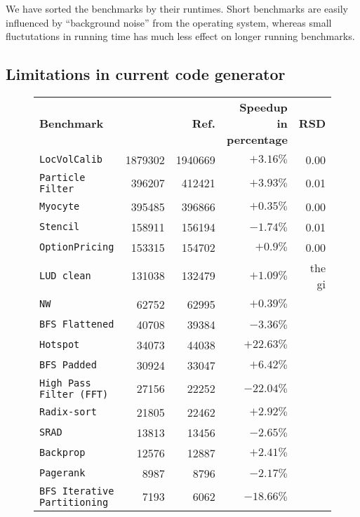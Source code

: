 We have sorted the benchmarks by their runtimes.
Short benchmarks are easily influenced by ``background noise'' from the
operating system, whereas small fluctutations in running time has much less
effect on longer running benchmarks.

\subsection{Limitations in current \csharp{} code generator}

\begin{figure}[H]
  \begin{tabular}{l r r r r}
    \textbf{Benchmark} & \textbf{\csharp{}} & \textbf{Ref.} & \textbf{Speedup in percentage} & \textbf{RSD} \\
  \texttt{LocVolCalib}               & 1879302 &1940669 & $+ 3.16\%$ & 0.00 \\
  \texttt{Particle Filter}           & 396207 &412421 & $+ 3.93\%$ & 0.01 \\
  \texttt{Myocyte}                   & 395485 &396866 & $+ 0.35\%$ & 0.00 \\
  \texttt{Stencil}                   & 158911 &156194 & $- 1.74\%$ & 0.01 \\
  \texttt{OptionPricing}             & 153315 &154702 & $+ 0.9\%$ & 0.00 \\
    \texttt{LUD clean}                 & 131038 & 132479 & $+ 1.09\%$ & the gi\\
  \texttt{NW}                        & 62752 &62995 & $+ 0.39\%$ \\
  \texttt{BFS Flattened}             & 40708 &39384 & $- 3.36\%$ \\
  \texttt{Hotspot}                   & 34073 &44038 & $+ 22.63\%$ \\
  \texttt{BFS Padded}                & 30924 &33047 & $+ 6.42\%$ \\
  \texttt{High Pass Filter (FFT)}    & 27156 &22252 & $- 22.04\%$ \\
  \texttt{Radix-sort}                & 21805 &22462 & $+ 2.92\%$ \\
  \texttt{SRAD}                      & 13813 &13456 & $- 2.65\%$ \\
  \texttt{Backprop}                  & 12576 &12887 & $+ 2.41\%$ \\
  \texttt{Pagerank}                  & 8987 &8796 & $- 2.17\%$ \\
  \texttt{BFS Iterative Partitioning}& 7193 &6062 & $- 18.66\%$ \\

\end{tabular}
\end{figure}
